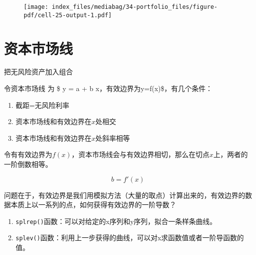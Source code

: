 \documentclass[
  letterpaper,
  DIV=11,
  numbers=noendperiod]{scrreprt}
\providecommand{\tightlist}{%
  \setlength{\itemsep}{0pt}\setlength{\parskip}{0pt}}\usepackage{longtable,booktabs,array}
\begin{document}
\begin{figure}[H]

{\centering \texttt{[image: index\_files/mediabag/34-portfolio\_files/figure-pdf/cell-25-output-1.pdf]}

}

\end{figure}

\hypertarget{ux8d44ux672cux5e02ux573aux7ebf}{%
\section{资本市场线}\label{ux8d44ux672cux5e02ux573aux7ebf}}

把无风险资产加入组合

令资本市场线 为 \$ y = a + b x\(，有效边界为\)y=f(x)\$，有几个条件：

\begin{enumerate}
\def\labelenumi{\arabic{enumi}.}
\tightlist
\item
  截距=无风险利率
\item
  资本市场线和有效边界在\(x\)处相交
\item
  资本市场线和有效边界在\(x\)处斜率相等
\end{enumerate}

令有有效边界为\(f(x)\)，资本市场线会与有效边界相切，那么在切点\(x\)上，两者的一阶倒数相等。

\[
b = f'(x)
\]

问题在于，有效边界是我们用模拟方法（大量的取点）计算出来的，有效边界的数据本质上以一系列的点，如何获得有效边界的一阶导数？

\begin{enumerate}
\def\labelenumi{\arabic{enumi}.}
\tightlist
\item
  \texttt{splrep()}函数：可以对给定的x序列和y序列，拟合一条样条曲线。
\item
  \texttt{splev()}函数：利用上一步获得的曲线，可以对x求函数值或者一阶导函数的值。
\end{enumerate}
\end{document}
